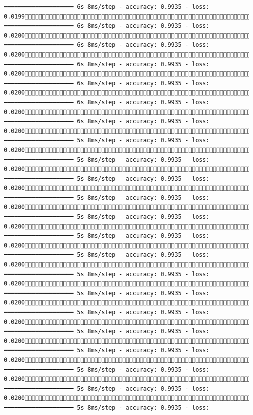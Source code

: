 \documentclass[
  letterpaper,
  DIV=11,
  numbers=noendperiod]{scrreprt}
\begin{document}
\begin{verbatim}
━━━━━━━━━━━━━━━━━━━━ 6s 8ms/step - accuracy: 0.9935 - loss: 0.01991064/1875 ━━━━━━━━━━━━━━━━━━━━ 6s 8ms/step - accuracy: 0.9935 - loss: 0.02001072/1875 ━━━━━━━━━━━━━━━━━━━━ 6s 8ms/step - accuracy: 0.9935 - loss: 0.02001079/1875 ━━━━━━━━━━━━━━━━━━━━ 6s 8ms/step - accuracy: 0.9935 - loss: 0.02001086/1875 ━━━━━━━━━━━━━━━━━━━━ 6s 8ms/step - accuracy: 0.9935 - loss: 0.02001094/1875 ━━━━━━━━━━━━━━━━━━━━ 6s 8ms/step - accuracy: 0.9935 - loss: 0.02001101/1875 ━━━━━━━━━━━━━━━━━━━━ 6s 8ms/step - accuracy: 0.9935 - loss: 0.02001108/1875 ━━━━━━━━━━━━━━━━━━━━ 5s 8ms/step - accuracy: 0.9935 - loss: 0.02001116/1875 ━━━━━━━━━━━━━━━━━━━━ 5s 8ms/step - accuracy: 0.9935 - loss: 0.02001124/1875 ━━━━━━━━━━━━━━━━━━━━ 5s 8ms/step - accuracy: 0.9935 - loss: 0.02001131/1875 ━━━━━━━━━━━━━━━━━━━━ 5s 8ms/step - accuracy: 0.9935 - loss: 0.02001138/1875 ━━━━━━━━━━━━━━━━━━━━ 5s 8ms/step - accuracy: 0.9935 - loss: 0.02001145/1875 ━━━━━━━━━━━━━━━━━━━━ 5s 8ms/step - accuracy: 0.9935 - loss: 0.02001152/1875 ━━━━━━━━━━━━━━━━━━━━ 5s 8ms/step - accuracy: 0.9935 - loss: 0.02001159/1875 ━━━━━━━━━━━━━━━━━━━━ 5s 8ms/step - accuracy: 0.9935 - loss: 0.02001166/1875 ━━━━━━━━━━━━━━━━━━━━ 5s 8ms/step - accuracy: 0.9935 - loss: 0.02001173/1875 ━━━━━━━━━━━━━━━━━━━━ 5s 8ms/step - accuracy: 0.9935 - loss: 0.02001180/1875 ━━━━━━━━━━━━━━━━━━━━ 5s 8ms/step - accuracy: 0.9935 - loss: 0.02001186/1875 ━━━━━━━━━━━━━━━━━━━━ 5s 8ms/step - accuracy: 0.9935 - loss: 0.02001193/1875 ━━━━━━━━━━━━━━━━━━━━ 5s 8ms/step - accuracy: 0.9935 - loss: 0.02001201/1875 ━━━━━━━━━━━━━━━━━━━━ 5s 8ms/step - accuracy: 0.9935 - loss: 0.02001208/1875 ━━━━━━━━━━━━━━━━━━━━ 5s 8ms/step - accuracy: 0.9935 - loss: 
\end{verbatim}
\end{document}
